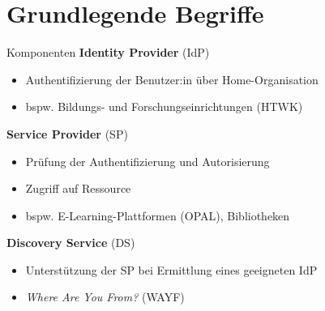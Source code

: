 
\section{Grundlegende Begriffe}

\begin{frame}{Komponenten}
    \alert{\textbf{Identity Provider}} (IdP)
    \vspace{-\topsep}
    \begin{itemize}
        \item Authentifizierung der Benutzer:in über Home-Organisation ~\cite{dfnDFNAAIDokumentationEinfuhrung, shibbolethShibbolethConcepts2023}
        \item bspw. Bildungs- und Forschungseinrichtungen (HTWK)
    \end{itemize}
    
    \pause
    \alert{\textbf{Service Provider}} (SP)
    \vspace{-\topsep}
    \begin{itemize}
        \item Prüfung der Authentifizierung und Autorisierung
        \item Zugriff auf Ressource~\cite{shibbolethServiceProviderApplication2021, shibbolethServiceProviderProtectContent2021, shibbolethShibbolethConcepts2023}
        \item bspw. E-Learning-Plattformen (OPAL), Bibliotheken~\cite{dfnDFNAAIDokumentationEinfuhrung}
    \end{itemize}
    
    \pause
    \alert{\textbf{Discovery Service}} (DS)
    \vspace{-\topsep}
    \begin{itemize}
        \item Unterstützung der SP bei Ermittlung eines geeigneten IdP
        \item \emph{Where Are You From?} (WAYF)~\cite{shibbolethIdPDiscoveryShibbolethConcepts2020, shibbolethShibbolethConcepts2023, switchSimpleDemoSwitchAAI2024}
    \end{itemize}
\end{frame}


